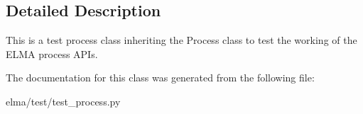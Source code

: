 \subsection{Detailed Description}
This is a test process class inheriting the Process class to test the working of the E\+L\+MA process A\+P\+Is. 



The documentation for this class was generated from the following file\+:\begin{DoxyCompactItemize}
\item 
elma/test/test\+\_\+process.\+py\end{DoxyCompactItemize}

